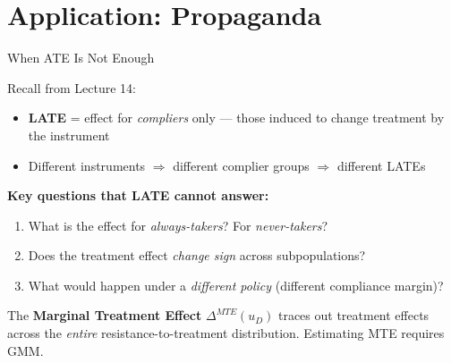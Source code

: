 \documentclass[aspectratio=169, handout]{beamer}
\numberwithin{equation}{section}
\begin{document}
\section{Application: Propaganda}

\begin{frame}{When ATE Is Not Enough}

Recall from Lecture 14:
\begin{itemize}
\item \textbf{LATE} = effect for \textit{compliers} only --- those induced to change treatment by the instrument
\item Different instruments $\Rightarrow$ different complier groups $\Rightarrow$ \alert{different LATEs}
\end{itemize}

\medskip
\textbf{Key questions that LATE cannot answer:}
\begin{enumerate}
\item What is the effect for \textit{always-takers}? For \textit{never-takers}?
\item Does the treatment effect \textit{change sign} across subpopulations?
\item What would happen under a \textit{different policy} (different compliance margin)?
\end{enumerate}

\medskip
\begin{tcolorbox}[colback=blue!5, colframe=blue!50]
The \textbf{Marginal Treatment Effect} $\Delta^{MTE}(u_D)$ traces out treatment effects across the \textit{entire} resistance-to-treatment distribution. Estimating MTE requires GMM.
\end{tcolorbox}

\end{frame}
\end{document}
